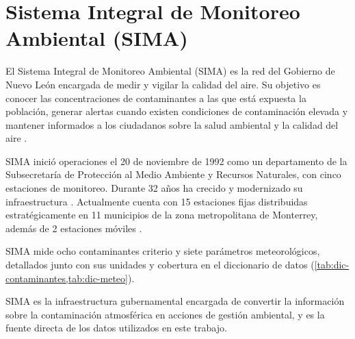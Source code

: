 \section{Sistema Integral de Monitoreo Ambiental (SIMA)}
\label{sec:sima}

El Sistema Integral de Monitoreo Ambiental (SIMA) es la red del Gobierno de
Nuevo León encargada de medir y vigilar la calidad del aire. Su objetivo es
conocer las concentraciones de contaminantes a las que está expuesta la
población, generar alertas cuando existen condiciones de contaminación elevada
y mantener informados a los ciudadanos sobre la salud ambiental y la calidad del
aire \parencite{gobiernoNL2026PIGECA}.

SIMA inició operaciones el 20 de noviembre de 1992 como un departamento de la
Subsecretaría de Protección al Medio Ambiente y Recursos Naturales, con
cinco estaciones de monitoreo. Durante 32 años ha crecido y modernizado
su infraestructura \parencite{villasaez2024}. Actualmente cuenta con 15
estaciones fijas distribuidas estratégicamente en 11 municipios de la zona
metropolitana de Monterrey, además de 2 estaciones móviles
\parencite{gobiernoNL2026ModernizacionSIMA}.

SIMA mide ocho contaminantes criterio y siete parámetros meteorológicos,
detallados junto con sus unidades y cobertura en el diccionario de datos
(\cref{tab:dic-contaminantes,tab:dic-meteo}).

SIMA es la infraestructura gubernamental encargada de convertir la información
sobre la contaminación atmosférica en acciones de gestión ambiental, y es la
fuente directa de los datos utilizados en este trabajo.